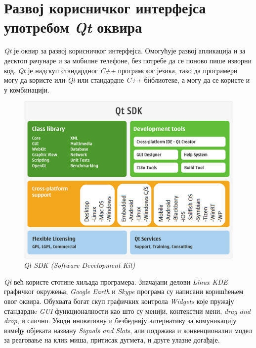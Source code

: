 \documentclass[11pt,a4paper,serbian,oneside]{book}
\begin{document}
%
%
%

\chapter{Развој корисничког интерфејса употребом \textit{Qt} оквира}

\textit{Qt} \cite{qt} је оквир за развој корисничког интерфејса. Омогућује развој апликација и за десктоп рачунаре и за мобилне телефоне, без потребе да се поново пише изворни код. \textit{Qt} је надскуп стандардног \textit{C++} програмског језика, тако да програмери могу да користе или \textit{Qt} или стандардне \textit{C++} библиотеке, а могу да се користе и у комбинацији.

\begin{figure}[htb]
\begin{center}
\includegraphics[width=150mm]{images/qt_platforms.png}
\end{center}
\caption{\textit{Qt SDK (Software Development Kit)}}
\label{fig:qtsdk}
\end{figure}

\textit{Qt} већ користе стотине хиљада програмера. Значајани делови \textit{Linux KDE} графичког окружења, \textit{Google Earth} и \textit{Skype} програма су написани коришћењем овог оквира. Обухвата богат скуп графичких контрола \textit{Widgets} које пружају стандарднe \textit{GUI} функционалности као што су менији, контекстни мени, \textit{drag and drop}, и слично. Уводи иновативну и безбеднију алтернативу за комуникацију између објеката названу \textit{Signals and Slots}, али подржава и конвенционални модел за реаговање на клик миша, притисак дугмета, и друге улазне догађаје.
\end{document}

